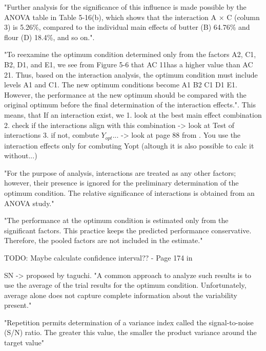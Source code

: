 "Further analysis for the significance of this influence is made possible by the ANOVA table in Table 5-16(b), which shows that the interaction A × C (column 3) is 5.26\%, compared to the individual main effects of butter (B) 64.76\% and flour (D) 18.4\%, and so on."\cite{roy_primer_1990}.

"To reexamine the optimum condition determined only from the factors A2, C1, B2, D1, and E1, we see from Figure 5-6 that AC 11has a higher value than AC 21. Thus, based on the interaction analysis, the optimum condition must include levels A1 and C1. The new optimum conditions become A1 B2 C1 D1 E1. However, the performance at the new optimum should be compared with the original optimum before the final determination of the interaction effects."\cite{roy_primer_1990}.
This means, that If an interaction exist, we
1. look at the best main effect combination
2. check if the interactions align with this combination -> look at Test of interactions
3. if not, combute $Y_{opt}$... -> look at page 88 from \cite{roy_primer_1990}. You use the interaction effects only for combuting Yopt (altough it is also possible to calc it without...)

"For the purpose of analysis, interactions are treated as any other factors; however, their presence is ignored for the preliminary determination of the optimum condition. The relative significance of interactions is obtained from an ANOVA study."\cite{roy_primer_1990}


"The performance at the optimum condition is estimated only from the significant factors. This practice keeps the predicted performance conservative. Therefore, the pooled factors are not included in the estimate."\cite{roy_primer_1990}


TODO: Maybe calculate confidence interval?? - Page 174 in \cite{roy_primer_1990}












SN -> proposed by taguchi. "A common approach to analyze such results is to use the average of the trial results for the optimum condition. Unfortunately, average alone does not capture complete information about the variability present."\cite{roy_primer_1990}

"Repetition permits determination of a variance index called the signal-to-noise (S/N) ratio. The greater this value, the smaller the product variance around the target value"\cite{roy_primer_1990}

